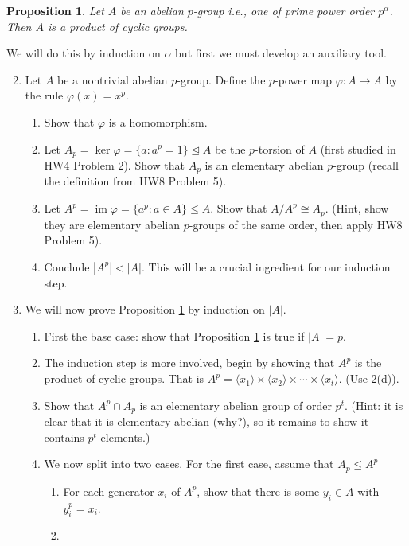 \documentclass[11pt]{article}
\newtheorem{proposition}{Proposition}
\newcommand{\la}{\langle}
\newcommand{\ra}{\rangle}
\newcommand{\im}{\operatorname{im}}
\begin{document}
\begin{proposition}\label{pmain}
   Let $A$ be an abelian $p$-group i.e., one of prime power order $p^\alpha$.  Then $A$ is a product of cyclic groups.
\end{proposition}
We will do this by induction on $\alpha$ but first we must develop an auxiliary tool.
\begin{enumerate}
  \setcounter{enumi}{1}
  \item{
  Let $A$ be a nontrivial abelian $p$-group.  Define the $p$-power map $\varphi:A\to A$ by the rule $\varphi(x) = x^p$.
  \begin{enumerate}
    \item{
    Show that $\varphi$ is a homomorphism.
    }
    \item{
    Let $A_p = \ker\varphi = \{a:a^p = 1\}\unlhd A$ be the $p$-torsion of $A$ (first studied in HW4 Problem 2).  Show that $A_p$ is an elementary abelian $p$-group (recall the definition from HW8 Problem 5).
    }
    \item{
    Let $A^p = \im\varphi = \{a^p: a\in A\}\le A$.  Show that $A/A^p\cong A_p$.  (Hint, show they are elementary abelian $p$-groups of the same order, then apply HW8 Problem 5).
    }
    \item{
    Conclude $|A^p|<|A|$.  This will be a crucial ingredient for our induction step.
    }
  \end{enumerate}
  }
  \item{
  We will now prove Proposition \ref{pmain} by induction on $|A|$.
  \begin{enumerate}
    \item{
    First the base case: show that Proposition \ref{pmain} is true if $|A| = p$.
    }
    \item{
    The induction step is more involved, begin by showing that $A^p$ is the product of cyclic groups.  That is $A^p = \la x_1\ra\times\la x_2\ra\times\cdots\times\la x_t\ra$. (Use 2(d)).
    }
    \item{
    Show that $A^p\cap A_p$ is an elementary abelian group of order $p^t$.  (Hint: it is clear that it is elementary abelian (why?), so it remains to show it contains $p^t$ elements.)
    }
    \item{
    We now split into two cases.  For the first case, assume that $A_p\le A^p$
    \begin{enumerate}
      \item{
      For each generator $x_i$ of $A^p$, show that there is some $y_i\in A$ with $y_i^p = x_i$.
      }
      \item{
}
\end{enumerate}}
\end{enumerate}}
\end{enumerate}
\end{document}
